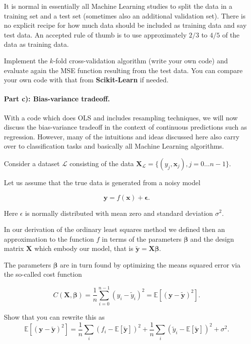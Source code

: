\documentclass[%
oneside,                 %
final,                   %
10pt]{article}
\begin{document}
It is normal in essentially all Machine Learning studies to split the
data in a training set and a test set (sometimes also an additional
validation set).  There
is no explicit recipe for how much data should be included as training
data and say test data.  An accepted rule of thumb is to use
approximately $2/3$ to $4/5$ of the data as training data.


Implement the $k$-fold cross-validation algorithm (write your own
code) and evaluate again the MSE function resulting
from the test data. You can compare your own code with that from
\textbf{Scikit-Learn} if needed.




\paragraph{Part c): Bias-variance tradeoff.}
With a code which does OLS and includes resampling techniques, 
we will now discuss the bias-variance tradeoff in the context of
continuous predictions such as regression. However, many of the
intuitions and ideas discussed here also carry over to classification
tasks and basically all Machine Learning algorithms. 

Consider a
dataset $\mathcal{L}$ consisting of the data
$\mathbf{X}_\mathcal{L}=\{(y_j, \boldsymbol{x}_j), j=0\ldots n-1\}$.

Let us assume that the true data is generated from a noisy model

\[
\bm{y}=f(\boldsymbol{x}) + \bm{\epsilon}.
\]

Here $\epsilon$ is normally distributed with mean zero and standard
deviation $\sigma^2$.

In our derivation of the ordinary least squares method we defined then
an approximation to the function $f$ in terms of the parameters
$\bm{\beta}$ and the design matrix $\bm{X}$ which embody our model,
that is $\bm{\tilde{y}}=\bm{X}\bm{\beta}$.

The parameters $\bm{\beta}$ are in turn found by optimizing the means
squared error via the so-called cost function

\[
C(\bm{X},\bm{\beta}) =\frac{1}{n}\sum_{i=0}^{n-1}(y_i-\tilde{y}_i)^2=\mathbb{E}\left[(\bm{y}-\bm{\tilde{y}})^2\right].
\]

Show that you can rewrite  this as
\[
\mathbb{E}\left[(\bm{y}-\bm{\tilde{y}})^2\right]=\frac{1}{n}\sum_i(f_i-\mathbb{E}\left[\bm{\tilde{y}}\right])^2+\frac{1}{n}\sum_i(\tilde{y}_i-\mathbb{E}\left[\bm{\tilde{y}}\right])^2+\sigma^2.
\]
\end{document}
